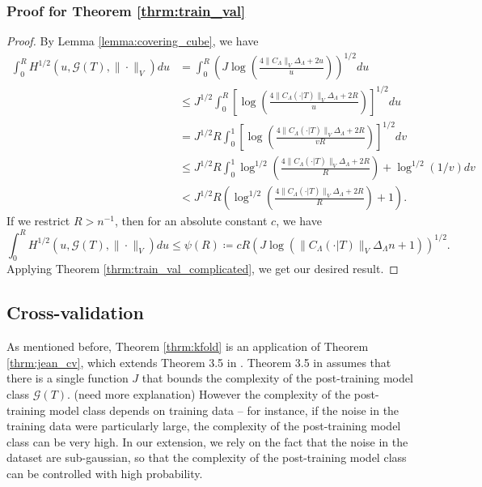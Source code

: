 \documentclass[10pt]{book}
\theoremstyle{definition}
\begin{document}
\subsubsection{Proof for Theorem \ref{thrm:train_val}}
\begin{proof}
	By Lemma \ref{lemma:covering_cube}, we have
	\begin{align}
	\int_{0}^{R}H^{1/2}(u,\mathcal{G}(T),\|\cdot\|_{V})du 
	&= \int_{0}^{R} \left ( 
	J \log \left(\frac{4 \|C_\Lambda\|_V \Delta_{\Lambda}+2u}{u}\right)
	\right )^{1/2}
	du\\
	& \le J^{1/2}\int_{0}^{R}\left[
	\log\left(
	\frac{4 \|C_\Lambda(\cdot | T)\|_V \Delta_{\Lambda} + 2R }
	{u}
	\right)
	\right]^{1/2}du\\
	& = J^{1/2}R \int_{0}^{1}\left[
	\log\left(
	\frac{4 \|C_\Lambda(\cdot | T)\|_V \Delta_{\Lambda} + 2R }
	{vR}
	\right)
	\right]^{1/2}dv\\
	& \le J^{1/2}R \int_{0}^{1}
	\log^{1/2}\left(
	\frac{4 \|C_\Lambda(\cdot | T)\|_V \Delta_{\Lambda} + 2R}
	{R}
	\right)
	+
	\log^{1/2}(1/v)
	dv\\
	& < J^{1/2}R \left (
	\log^{1/2}\left(
	\frac{4 \|C_\Lambda(\cdot | T)\|_V \Delta_{\Lambda} + 2R}
	{R}
	\right)
	+
	1
	\right ).
	\end{align}
	If we restrict $R > n^{-1}$, then for an absolute constant $c$, we have
	\begin{equation}
	\label{eq:train_val_entropy}
	\int_{0}^{R}H^{1/2}(u,\mathcal{G}(T),\|\cdot\|_{V})du
	\le
	\psi (R) 
	\coloneqq c R\left ( J \log(\|C_\Lambda(\cdot |T)\|_V \Delta_{\Lambda} n + 1) \right )^{1/2}.
	\end{equation}
	Applying Theorem \ref{thrm:train_val_complicated}, we get our desired result.
\end{proof}

\subsection{Cross-validation}
\label{app:cv}
As mentioned before, Theorem \ref{thrm:kfold} is an application of Theorem \ref{thrm:jean_cv}, which extends Theorem 3.5 in \citet{lecue2012oracle}.
Theorem 3.5 in \citet{lecue2012oracle} assumes that there is a single function $J$ that bounds the complexity of the post-training model class $\mathcal{G}(T)$. (need more explanation)
However the complexity of the post-training model class depends on training data -- for instance, if the noise in the training data were particularly large, the complexity of the post-training model class can be very high.
In our extension, we rely on the fact that the noise in the dataset are sub-gaussian, so that the complexity of the post-training model class can be controlled with high probability.
\end{document}

